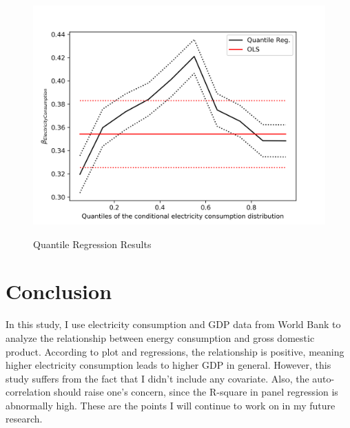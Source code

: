 \documentclass[11pt,letterpaper]{article}
\begin{document}
	\begin{center}
		\begin{figure}[ht!]
			\centering
			\caption{Quantile Regression Results}
			\includegraphics*[scale = 0.7]{quantile_regression.png} 
			\label{quantile}
		\end{figure}
	\end{center}		
	
	\section{Conclusion}
	In this study, I use electricity consumption and GDP data from World Bank to analyze the relationship between energy consumption and gross domestic product. According to plot and regressions, the relationship is positive, meaning higher electricity consumption leads to higher GDP in general. However, this study suffers from the fact that I didn't include any covariate. Also, the auto-correlation should raise one's concern, since the R-square in panel regression is abnormally high. These are the points I will continue to work on in my future research.
	
	
\end{document}
